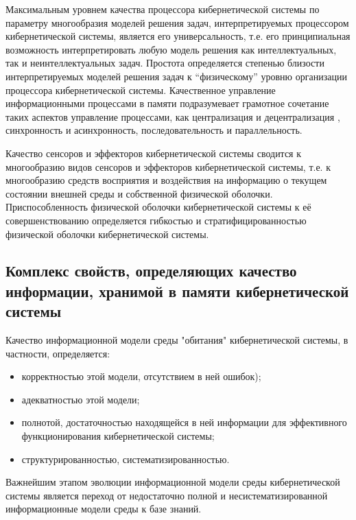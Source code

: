 Максимальным уровнем качества процессора кибернетической системы по параметру многообразия моделей решения задач, интерпретируемых процессором кибернетической системы, является его универсальность, т.е. его принципиальная возможность интерпретировать любую модель решения как интеллектуальных, так и неинтеллектуальных задач. 
Простота определяется степенью близости интерпретируемых моделей решения задач к “физическому” уровню организации процессора кибернетической системы. 
Качественное управление информационными процессами в памяти подразумевает грамотное сочетание таких аспектов управление процессами, как централизация и децентрализация , синхронность и асинхронность, последовательность и параллельность.

Качество сенсоров и эффекторов кибернетической системы сводится к многообразию видов сенсоров и эффекторов кибернетической системы, т.е. к многообразию средств восприятия и воздействия на информацию о текущем состоянии внешней среды и собственной физической оболочки.
Приспособленность физической оболочки кибернетической системы к её совершенствованию определяется гибкостью и стратифицированностью физической оболочки кибернетической системы.



\subsection{Комплекс свойств, определяющих качество информации, хранимой в памяти кибернетической системы}
{\label{sec_cyb_syst_information_quality}} 

Качество информационной модели среды "обитания"{} кибернетической системы, в частности, определяется:
\begin{itemize}
    \item{корректностью этой модели, отсутствием в ней ошибок);}
    \item{адекватностью этой модели;}
    \item{полнотой, достаточностью находящейся в ней информации для эффективного функционирования кибернетической системы;}
    \item{структурированностью, систематизированностью.}
\end{itemize}

Важнейшим этапом эволюции информационной модели среды кибернетической системы является переход от недостаточно полной и несистематизированной информационные модели среды к базе знаний.

